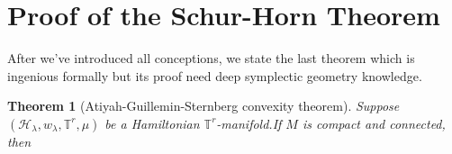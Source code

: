 \documentclass[11pt]{amsart}
\numberwithin{equation}{section}
\theoremstyle{plain}
\newtheorem{theorem}{Theorem}[section]
\theoremstyle{plain}
\numberwithin{equation}{section}
\theoremstyle{remark}
\begin{document}
\section{Proof of the Schur-Horn Theorem} 

After we’ve introduced all conceptions, we state the last theorem which is  ingenious formally but its proof need deep symplectic  geometry knowledge.
\begin{theorem}[Atiyah-Guillemin-Sternberg convexity theorem]
	Suppose $(\mathcal{H}_\lambda,w_\lambda, \mathbb{T}^r, \mu)$ be a Hamiltonian $\mathbb{T}^r$-manifold.If $M$ is compact and connected, then
	\begin{center}
	\end{center}

\end{theorem}
\end{document}
